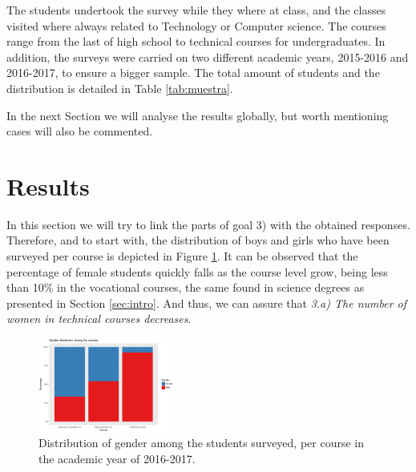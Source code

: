 \documentclass[journal,transmag]{IEEEtran}
\begin{document}
The students undertook the survey while they where at class, and the classes visited where always related to Technology or Computer science. The courses range from the last of high school to technical courses for undergraduates. In addition, the surveys were carried on two different academic years, 2015-2016 and 2016-2017, to ensure a bigger sample. The total amount of students and the distribution is detailed in Table \ref{tab:muestra}.

In the next Section we will analyse the results globally, but worth mentioning cases will also be commented.

\section{Results}
\label{sec:results}

In this section we will try to link the parts of goal 3) with the obtained responses. Therefore, and to start with, the distribution of boys and girls who have been surveyed per course is depicted in Figure \ref{fig:alumni}. It can be observed that the percentage of female students quickly falls as the course level grow, being less than 10\% in the vocational courses, the same found in science degrees as presented in Section \ref{sec:intro}. And thus, we can assure that \textit{3.a) The number of women in technical courses decreases}.

\begin{figure}
  \centering
  \includegraphics[width=0.4\textwidth]{img/gender_distribution.pdf}
  \caption{Distribution of gender among the students surveyed, per course in the academic year of 2016-2017.}
  \label{fig:alumni}
\end{figure}

%
\end{document}
